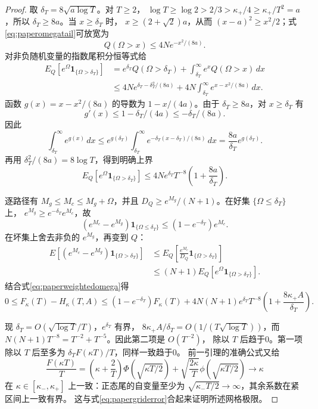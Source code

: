 \documentclass[UTF8,a4paper,11pt,fontset=fandol]{ctexart}
\theoremstyle{remark}
\begin{document}
\begin{proof}
取 $\delta_T=8\sqrt{a\log T}$。对 $T\ge2$，
$\log T\ge\log2>2/3>\kappa_+/4\ge\kappa_+/T^2=a$，所以
$\delta_T\ge8a$。当 $x\ge\delta_T$ 时，
$x\ge(2+\sqrt2)a$，从而 $(x-a)^2\ge x^2/2$；式
\eqref{eq:paperomegatail}可放宽为
\[
 Q(\Omega>x)\le4Ne^{-x^2/(8a)}.
\]
对非负随机变量的指数尾积分恒等式给
\begin{align*}
 E_Q[e^\Omega\mathbf1_{\{\Omega>\delta_T\}}]
 &=e^{\delta_T}Q(\Omega>\delta_T)
 +\int_{\delta_T}^\infty e^xQ(\Omega>x)\,dx\\
 &\le4N e^{\delta_T-\delta_T^2/(8a)}
 +4N\int_{\delta_T}^\infty e^{x-x^2/(8a)}\,dx.
\end{align*}
函数 $g(x)=x-x^2/(8a)$ 的导数为 $1-x/(4a)$。由于
$\delta_T\ge8a$，对 $x\ge\delta_T$ 有
\[
 g'(x)\le1-\delta_T/(4a)\le-\delta_T/(8a).
\]
因此
\[
 \int_{\delta_T}^\infty e^{g(x)}\,dx
 \le e^{g(\delta_T)}\int_{\delta_T}^\infty
 e^{-\delta_T(x-\delta_T)/(8a)}\,dx
 =\frac{8a}{\delta_T}e^{g(\delta_T)}.
\]
再用 $\delta_T^2/(8a)=8\log T$，得到明确上界
\begin{equation}\label{eq:paperweightedomega}
 E_Q[e^\Omega\mathbf1_{\{\Omega>\delta_T\}}]
 \le4Ne^{\delta_T}T^{-8}\left(1+\frac{8a}{\delta_T}\right).
\end{equation}

逐路径有 $M_g\le M_c\le M_g+\Omega$，并且
$D_Q\ge e^{M_g}/(N+1)$。在好集 $\{\Omega\le\delta_T\}$ 上，
$e^{M_g}\ge e^{-\delta_T}e^{M_c}$，故
\[
 (e^{M_c}-e^{M_g})\mathbf1_{\{\Omega\le\delta_T\}}
 \le(1-e^{-\delta_T})e^{M_c}.
\]
在坏集上舍去非负的 $e^{M_g}$，再变到 $Q$：
\begin{align*}
 E[(e^{M_c}-e^{M_g})\mathbf1_{\{\Omega>\delta_T\}}]
 &\le E_Q\left[\frac{e^{M_c}}{D_Q}
 \mathbf1_{\{\Omega>\delta_T\}}\right]\\
 &\le(N+1)E_Q[e^\Omega\mathbf1_{\{\Omega>\delta_T\}}].
\end{align*}
结合式\eqref{eq:paperweightedomega}得
\begin{equation}\label{eq:papergriderror}
 0\le F_\kappa(T)-H_\kappa(T,A)
 \le(1-e^{-\delta_T})F_\kappa(T)
 +4N(N+1)e^{\delta_T}T^{-8}
 \left(1+\frac{8\kappa_+A}{\delta_T}\right).
\end{equation}

现 $\delta_T=O(\sqrt{\log T}/T)$，$e^{\delta_T}$ 有界，
$8\kappa_+A/\delta_T=O(1/(T\sqrt{\log T}))$，而
$N(N+1)T^{-8}=T^{-2}+T^{-5}$。因此第二项是 $O(T^{-2})$，
除以 $T$ 后趋于0。第一项除以 $T$ 后至多为
$\delta_T F(\kappa T)/T$，同样一致趋于0。
前一引理的准确公式又给
\[
 \frac{F(\kappa T)}T
 =\left(\kappa+\frac2T\right)\Phi(\sqrt{\kappa T/2})
 +\sqrt{\frac{2\kappa}{T}}\phi(\sqrt{\kappa T/2})
 \longrightarrow\kappa
\]
在 $\kappa\in[\kappa_-,\kappa_+]$ 上一致：正态尾的自变量至少为
$\sqrt{\kappa_-T/2}\to\infty$，其余系数在紧区间上一致有界。
这与式\eqref{eq:papergriderror}合起来证明所述网格极限。
\end{proof}
\end{document}
